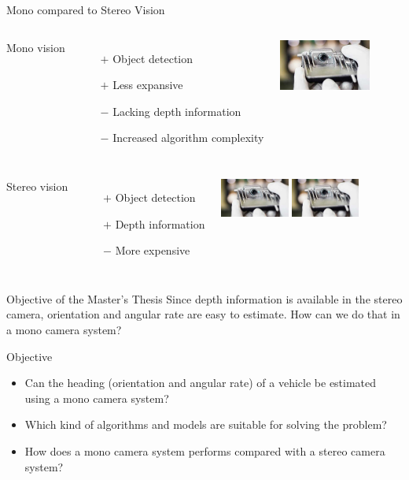 \documentclass{beamer}
\begin{document}
\begin{frame}{Mono compared to Stereo Vision}
	\begin{columns}
		Mono vision
		\begin{itemize}
			\item[$+$] Object detection
			\item[$+$] Less expansive
			\item[$-$] Lacking depth information
			\item[$-$] Increased algorithm complexity
		\end{itemize}
		\begin{center}
			\includegraphics[width=3cm]{fig/ALV_Mono-Vision-Sensor}
		\end{center}
	\end{columns}
	\vspace{1em}
	\begin{columns}
		\column{0.5\textwidth}
		Stereo vision
		\begin{itemize}
			\item[$+$] Object detection
			\item[$+$] Depth information
			\item[$-$] More expensive
		\end{itemize}
		\column{0.4\textwidth}
		\begin{center}
			\includegraphics[width=2.25cm]{fig/ALV_Mono-Vision-Sensor}
			\hfill
			\includegraphics[width=2.25cm]{fig/ALV_Mono-Vision-Sensor}
		\end{center}
	\end{columns}
\end{frame}

\begin{frame}{Objective of the Master's Thesis}
	Since depth information is available in the stereo camera, orientation and angular rate are easy to estimate.
	How can we do that in a mono camera system?
	\pause
	\begin{block}{Objective}
		\begin{itemize}
			\item Can the heading (orientation and angular rate) of a vehicle be estimated using a mono camera system?
			\item Which kind of algorithms and models are suitable for solving the problem?
			\item How does a mono camera system performs compared with a stereo camera system?
		\end{itemize}
	\end{block}
\end{frame}
\end{document}
